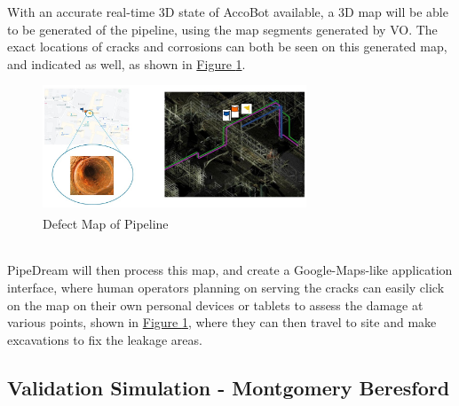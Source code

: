 \documentclass[11pt]{article}		%
\newcommand{\supercite}[1]{\textsuperscript{\cite{#1}}}		%
\newcommand{\figref}[1]{\hyperref[#1]{Figure \ref*{#1}}}    %
\begin{document}
	    With an accurate real-time 3D state of AccoBot available, a 3D map will be able to be generated of the pipeline, using the map segments generated by VO. The exact locations of cracks and corrosions can both be seen on this generated map, and indicated as well, as shown in \figref{defectMap}.
			\begin{figure}[h]
				\centering
				\includegraphics[width=0.7\textwidth]{mapping.jpg}
				\caption{Defect Map of Pipeline\supercite{ELFTransmitter}}
				\label{defectMap}
			\end{figure}
	    \\
        \hspace*{2ex}PipeDream will then process this map, and create a Google-Maps-like application interface, where human operators planning on serving the cracks can easily click on the map on their own personal devices or tablets to assess the damage at various points, shown in \figref{defectMap}, where they can then travel to site and make excavations to fix the leakage areas. 
	
	  \subsection[Validation Simulation]{Validation Simulation - Montgomery Beresford} \label{simulation}
	        
\end{document}
